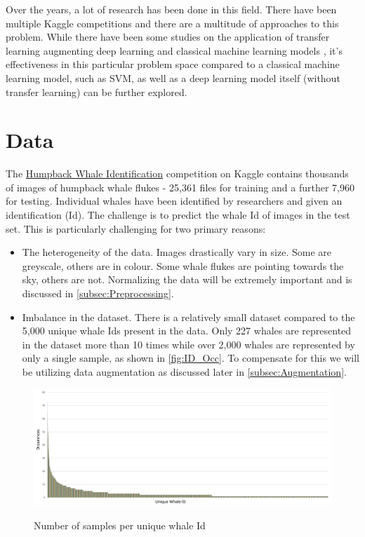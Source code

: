 \documentclass[paper=a4, fontsize=11pt]{scrartcl}
\numberwithin{equation}{section}		%
\numberwithin{table}{section}				%
\begin{document}
Over the years, a lot of research has been done in this field. There have been multiple Kaggle competitions and there are a multitude of approaches to this problem. While there have been some studies on the application of transfer learning augmenting deep learning and classical machine learning models \cite{YuanHongchun2020AAIC}, it's effectiveness in this particular problem space compared to a classical machine learning model, such as SVM, as well as a deep learning model itself (without transfer learning) can be further explored.

\section{Data}\label{sec: data}

The \href{https://www.kaggle.com/competitions/humpback-whale-identification/overview}{Humpback Whale Identification} competition on Kaggle contains thousands of images of humpback whale flukes - 25,361 files for training and a further 7,960 for testing. Individual whales have been identified by researchers and given an identification (Id). The challenge is to predict the whale Id of images in the test set. This is particularly challenging for two primary reasons:
\begin{itemize}
  \item The heterogeneity of the data. Images drastically vary in size. Some are greyscale, others are in colour. Some whale flukes are pointing towards the sky, others are not. Normalizing the data will be extremely important and is discussed in \autoref{subsec:Preprocessing}.
  \item Imbalance in the dataset. There is a relatively small dataset compared to the 5,000 unique whale Ids present in the data. Only 227 whales are represented in the dataset more than 10 times while over 2,000 whales are represented by only a single sample, as shown in \autoref{fig:ID_Occ}. To compensate for this we will be utilizing data augmentation as discussed later in \autoref{subsec:Augmentation}.
\end{itemize}

\begin{figure}[H]
    \caption{Number of samples per unique whale Id}
    \centering
    \includegraphics[width=\textwidth]{ID_Occurences.png}
    \label{fig:ID_Occ}
\end{figure}
\end{document}
